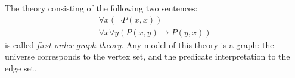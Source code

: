 

\setcounter{section}{3}
\setcounter{subsection}{1}
\setcounter{dfn}{1}

\begin{exl}
\label{exl:FirstGraphTheory}
The theory consisting of the following two sentences:
\begin{gather*}
\forall x (\neg P(x,x))\\
\forall x \forall y (P(x,y) \to P(y,x))
\end{gather*}
is called \emph{first-order graph theory}.
Any model of this theory is a graph:
the universe corresponds to the vertex set, and the predicate interpretation to the edge set.

\end{exl}


